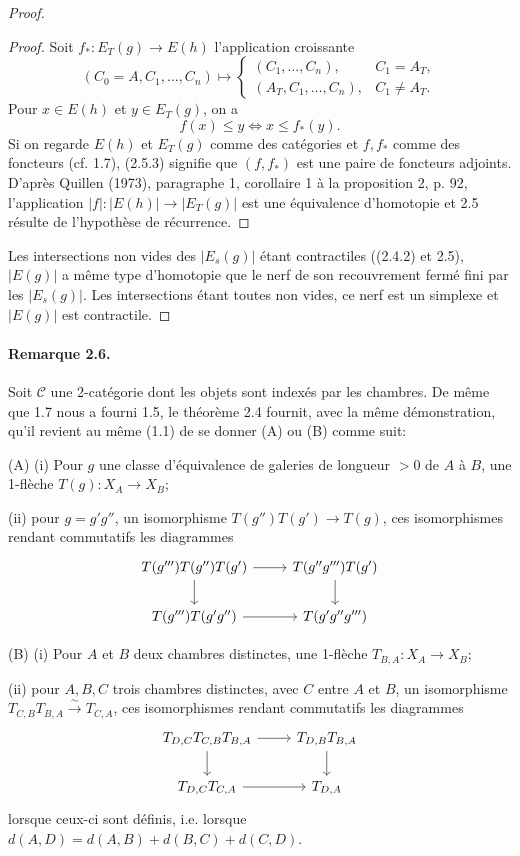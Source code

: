 \documentclass[11pt]{article}
\newcommand{\calC}{\mathcal C}
\begin{document}
\begin{proof}
\begin{proof}
Soit $f_*:E_T(g)\to E(h)$ l'application croissante
\begin{equation}
 (C_0=A,C_1,\ldots,C_n)\mapsto
 \begin{cases}
  (C_1,\ldots,C_n),& C_1=A_T,\\
  (A_T,C_1,\ldots,C_n),& C_1\ne A_T.
 \end{cases}
\tag{2.5.2}
\end{equation}
Pour $x\in E(h)$ et $y\in E_T(g)$, on a
\begin{equation}
 f(x)\leq y\Longleftrightarrow x\leq f_*(y).
\tag{2.5.3}
\end{equation}
Si on regarde $E(h)$ et $E_T(g)$ comme des catégories et $f,f_*$ comme des foncteurs (cf. 1.7), (2.5.3) signifie que $(f,f_*)$ est une paire de foncteurs adjoints. D'après Quillen (1973), paragraphe 1, corollaire 1 à la proposition 2, p. 92, l'application $|f|:|E(h)|\to |E_T(g)|$ est une équivalence d'homotopie et 2.5 résulte de l'hypothèse de récurrence.
\end{proof}
Les intersections non vides des $|E_s(g)|$ étant contractiles ((2.4.2) et 2.5), $|E(g)|$ a même type d'homotopie que le nerf de son recouvrement fermé fini par les $|E_s(g)|$. Les intersections étant toutes non vides, ce nerf est un simplexe et $|E(g)|$ est contractile.
\end{proof}

\paragraph{Remarque 2.6.} Soit $\calC$ une 2-catégorie dont les objets sont indexés par les chambres. De même que 1.7 nous a fourni 1.5, le théorème 2.4 fournit, avec la même démonstration, qu'il revient au même (1.1) de se donner (A) ou (B) comme suit:

(A) (i) Pour $g$ une classe d'équivalence de galeries de longueur $>0$ de $A$ à $B$, une 1-flèche $T(g):X_A\to X_B$;

(ii) pour $g=g'g''$, un isomorphisme $T(g'')T(g')\to T(g)$, ces isomorphismes rendant commutatifs les diagrammes
\[
\begin{tikzcd}
T(g''')T(g'')T(g') \arrow[r] \arrow[d] & T(g''g''')T(g') \arrow[d]\\
T(g''')T(g'g'') \arrow[r] & T(g'g''g''')
\end{tikzcd}
\]

(B) (i) Pour $A$ et $B$ deux chambres distinctes, une 1-flèche $T_{B,A}:X_A\to X_B$;

(ii) pour $A,B,C$ trois chambres distinctes, avec $C$ entre $A$ et $B$, un isomorphisme $T_{C,B}T_{B,A}\xrightarrow{\sim}T_{C,A}$, ces isomorphismes rendant commutatifs les diagrammes
\[
\begin{tikzcd}
T_{D,C}T_{C,B}T_{B,A} \arrow[r] \arrow[d] & T_{D,B}T_{B,A} \arrow[d]\\
T_{D,C}T_{C,A} \arrow[r] & T_{D,A}
\end{tikzcd}
\]
lorsque ceux-ci sont définis, i.e. lorsque $d(A,D)=d(A,B)+d(B,C)+d(C,D)$.
\end{document}
